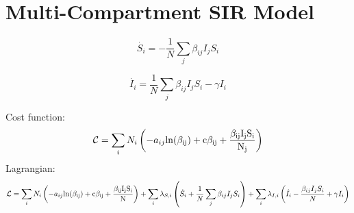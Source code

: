 \documentclass[11pt]{article} %
\begin{document}
\section{Multi-Compartment SIR Model}
\begin{equation}
\dot{S_i} = -\frac{1}{N}\sum_j{\beta_{ij}I_jS_i}
\end{equation}

\begin{equation}
\dot{I_i} = \frac{1}{N}\sum_j{\beta_{ij}I_jS_i}-\gamma I_i
\end{equation}

Cost function:
\begin{equation}
\mathcal{C} =\sum_i N_i\left( -a_{ij}\rm{ln}({\beta_{ij}})+c\beta_{ij}+\frac{\beta_{ij}{I_jS_i}}{N_j}\right)
\end{equation}
Lagrangian:
\begin{equation}
\mathcal{L} = \sum_i N_i\left( -a_{ij}\rm{ln}({\beta_{ij}})+c\beta_{ij}+\frac{\beta_{ij}{I_jS_i}}{N}\right)+
\sum_i \lambda_{S,i}\left( \dot{S}_i+\frac{1}{N}\sum_j{\beta_{ij}I_jS_i}\right)+\sum_i \lambda_{I,i}\left(\dot{I}_i -\frac{\beta_{ij}I_jS_i}{N}+\gamma I_i  \right)
\end{equation}
\end{document}
